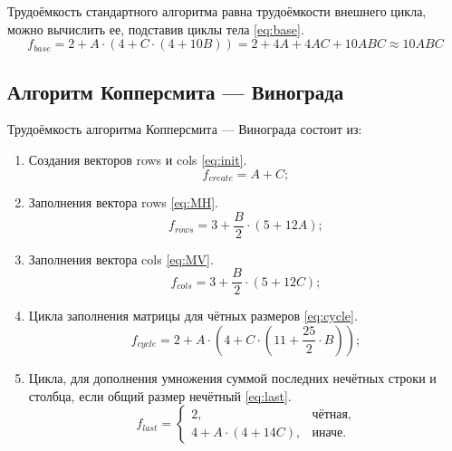 Трудоёмкость стандартного алгоритма равна трудоёмкости внешнего цикла, можно вычислить ее, подставив циклы тела \eqref{eq:base}.
\begin{equation}
    \label{eq:base}
    f_{base} = 2 + A \cdot (4 + C \cdot (4 + 10B)) = 2 + 4A + 4AC + 10ABC \approx 10ABC
\end{equation}

\subsection{Алгоритм Копперсмита — Винограда}

Трудоёмкость алгоритма Копперсмита — Винограда состоит из:

\begin{enumerate}
    \item Создания векторов rows и cols \eqref{eq:init}.
    \begin{equation}
        \label{eq:init}
        f_{create} = A + C;
    \end{equation}

    \item Заполнения вектора rows \eqref{eq:MH}.
    \begin{equation}
        \label{eq:MH}
        f_{rows} = 3 + \frac{B}{2} \cdot (5 + 12A);
    \end{equation}

    \item Заполнения вектора cols \eqref{eq:MV}.
    \begin{equation}
        \label{eq:MV}
        f_{cols} = 3 + \frac{B}{2} \cdot (5 + 12C);
    \end{equation}

    \item Цикла заполнения матрицы для чётных размеров \eqref{eq:cycle}.
    \begin{equation}
        \label{eq:cycle}
        f_{cycle} = 2 + A \cdot (4 + C \cdot (11 + \frac{25}{2} \cdot B));
    \end{equation}

    \item Цикла, для дополнения умножения суммой последних нечётных строки и столбца, если общий размер нечётный \eqref{eq:last}.
    \begin{equation}
        \label{eq:last}
        f_{last} = \begin{cases}
                       2, & \text{чётная,}\\
                       4 + A \cdot (4 + 14C), & \text{иначе.}
        \end{cases}
    \end{equation}
\end{enumerate}

